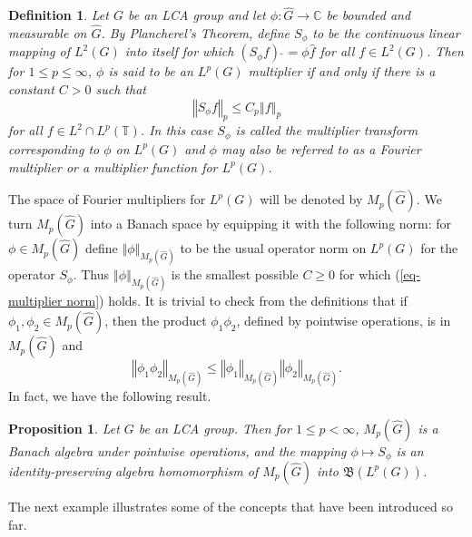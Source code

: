 \documentclass[mmath,12pt]{unswthesis}   %
\newcommand{\C}{\mathbb{C}}
\newcommand{\T}{\mathbb{T}}
\newcommand{\B}{\mathfrak{B}}
\newcommand{\hatt}[1]{\widehat #1}
\def\norm#1{\left \Vert #1 \right \Vert}
\newtheorem{proposition}[theorem]{Proposition}
\newtheorem{definition}[theorem]{Definition}
\numberwithin{equation}{section}
\begin{document}
\begin{definition}\label{multipliers}
Let $G$ be an LCA group and let
$\phi:\hatt{G}\rightarrow\C$ be bounded and measurable on $\hatt{G}$. By
Plancherel's Theorem, define $S_{\phi}$ to be the continuous linear mapping of
$L^2(G)$ into itself for which
$({S_{\phi}f})\,\hatt{\,} = \phi \hatt{f}$ for all $f\in L^2(G)$.
Then for $1\leq p\leq\infty$, $\phi$ is said to be an 
{\em $L^p(G)$ multiplier} if
and only if there is a constant $C>0$ such that
\begin{equation}\label{eq-multiplier norm}
\norm{S_{\phi}f}_p\leq C_p\norm{f}_p
\end{equation}
for all $f\in L^2\cap L^p(\T)$.
In this case $S_{\phi}$ is called the {\em multiplier transform corresponding
to $\phi$ on $L^p(G)$} and $\phi$ may also be referred to as a
{\em Fourier multiplier} or a {\em multiplier function} for $L^p(G)$.
\end{definition}


The space of Fourier multipliers for $L^p(G)$ will be denoted by
$M_p(\hatt{G})$. We turn $M_p(\hatt{G})$ into a Banach space by equipping it 
with
the following norm: for $\phi\in M_p(\hatt{G})$ define
$\norm{\phi}_{M_p(\hatt{G})}$ to be the usual operator norm on $L^p(G)$ for the
operator $S_{\phi}$. Thus $\norm{\phi}_{M_p(\hatt{G})}$ is the smallest
possible $C\geq 0$ for which (\ref{eq-multiplier norm}) holds. It is
trivial to check from the definitions that if $\phi_1,\phi_2\in M_p(\hatt{G})$,
then the product $\phi_1\phi_2$, defined by pointwise operations, is in
$M_p(\hatt{G})$ and
\[\norm{\phi_1\phi_2}_{M_p(\hatt{G})}\leq\norm{\phi_1}_{M_p(\hatt{G})}
\norm{\phi_2}_{M_p(\hatt{G})}.\]
In fact, we have the following result.

\begin{proposition}\label{multiplier algebra}\cite[\S3]{BG Spectral}
Let $G$ be an LCA group. Then for $1\leq p<\infty$,
$M_p(\hatt{G})$ is a Banach algebra under pointwise operations, and the mapping
$\phi\mapsto S_{\phi}$ is an identity-preserving algebra homomorphism of
$M_p(\hatt{G})$ into $\B(L^p(G))$.
\end{proposition}

The next example illustrates some of the concepts that
have been introduced so far.
\end{document}
